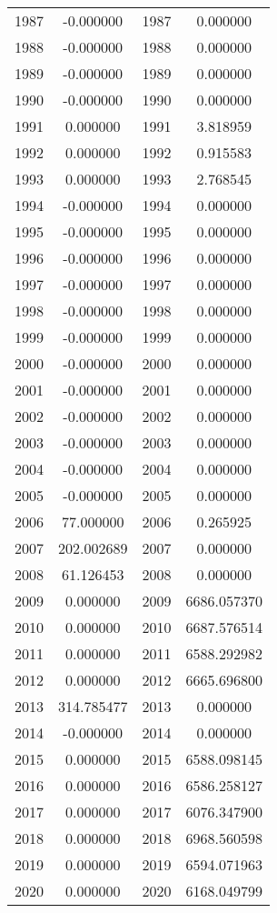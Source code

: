 \documentclass[12pt]{article}
\begin{document}
\begin{longtable}{@{}cccc@{}}
1987 & -0.000000 & 1987 & 0.000000 \\
1988 & -0.000000 & 1988 & 0.000000 \\
1989 & -0.000000 & 1989 & 0.000000 \\
1990 & -0.000000 & 1990 & 0.000000 \\
1991 & 0.000000 & 1991 & 3.818959 \\
1992 & 0.000000 & 1992 & 0.915583 \\
1993 & 0.000000 & 1993 & 2.768545 \\
1994 & -0.000000 & 1994 & 0.000000 \\
1995 & -0.000000 & 1995 & 0.000000 \\
1996 & -0.000000 & 1996 & 0.000000 \\
1997 & -0.000000 & 1997 & 0.000000 \\
1998 & -0.000000 & 1998 & 0.000000 \\
1999 & -0.000000 & 1999 & 0.000000 \\
2000 & -0.000000 & 2000 & 0.000000 \\
2001 & -0.000000 & 2001 & 0.000000 \\
2002 & -0.000000 & 2002 & 0.000000 \\
2003 & -0.000000 & 2003 & 0.000000 \\
2004 & -0.000000 & 2004 & 0.000000 \\
2005 & -0.000000 & 2005 & 0.000000 \\
2006 & 77.000000 & 2006 & 0.265925 \\
2007 & 202.002689 & 2007 & 0.000000 \\
2008 & 61.126453 & 2008 & 0.000000 \\
2009 & 0.000000 & 2009 & 6686.057370 \\
2010 & 0.000000 & 2010 & 6687.576514 \\
2011 & 0.000000 & 2011 & 6588.292982 \\
2012 & 0.000000 & 2012 & 6665.696800 \\
2013 & 314.785477 & 2013 & 0.000000 \\
2014 & -0.000000 & 2014 & 0.000000 \\
2015 & 0.000000 & 2015 & 6588.098145 \\
2016 & 0.000000 & 2016 & 6586.258127 \\
2017 & 0.000000 & 2017 & 6076.347900 \\
2018 & 0.000000 & 2018 & 6968.560598 \\
2019 & 0.000000 & 2019 & 6594.071963 \\
2020 & 0.000000 & 2020 & 6168.049799 \\

\end{longtable}
\end{document}
